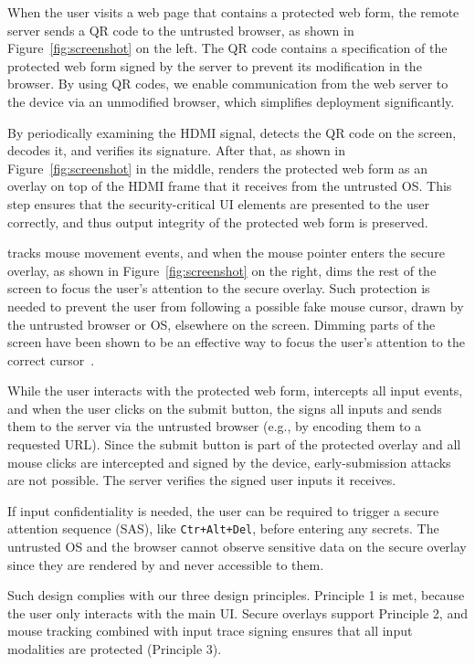 When the user visits a web page that contains a protected web form, the remote server sends a QR code to the untrusted browser, as shown in Figure~\ref{fig:screenshot} on the left. The QR code contains a specification of the protected web form signed by the server to prevent its modification in the browser. By using QR codes, we enable communication from the web server to the \hub device via an unmodified browser, which simplifies deployment significantly.

By periodically examining the HDMI signal, \hub detects the QR code on the screen, decodes it, and verifies its signature. After that, as shown in Figure~\ref{fig:screenshot} in the middle, \hub renders the protected web form as an overlay on top of the HDMI frame that it receives from the untrusted OS. This step ensures that the security-critical UI elements are presented to the user correctly, and thus output integrity of the protected web form is preserved.

\hub tracks mouse movement events, and when the mouse pointer enters the secure overlay, as shown in Figure~\ref{fig:screenshot} on the right, \hub dims the rest of the screen to focus the user's attention to the secure overlay. Such protection is needed to prevent the user from following a possible fake mouse cursor, drawn by the untrusted browser or OS, elsewhere on the screen. Dimming parts of the screen have been shown to be an effective way to focus the user's attention to the correct cursor~\cite{huang2012clickjacking}.

While the user interacts with the protected web form, \hub intercepts all input events, and when the user clicks on the submit button, the \hub signs all inputs and sends them to the server via the untrusted browser (e.g., by encoding them to a requested URL). Since the submit button is part of the protected overlay and all mouse clicks are intercepted and signed by the \hub device, early-submission attacks are not possible. The server verifies the signed user inputs it receives. 

If input confidentiality is needed, the user can be required to trigger a secure attention sequence (SAS), like \texttt{Ctr+Alt+Del}, before entering any secrets. The untrusted OS and the browser cannot observe sensitive data on the secure overlay since they are rendered by \hub and never accessible to them.

Such design complies with our three design principles. Principle 1 is met, because the user only interacts with the main UI. Secure overlays support Principle 2, and mouse tracking combined with input trace signing ensures that all input modalities are protected (Principle 3).

